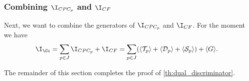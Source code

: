 \documentclass[11pt]{article}
\begin{document}
\subsubsection[Combining I(CPCp) and I(CF)]{Combining $\I_{CPC_p}$ and $\I_{CF}$}\label{sect:combin_gen}

Next, we want to combine the generators of $\I_{CPC_p}$ and $\I_{CF}$. For the moment we have
\begin{equation}\label{eqn:combinatorial_ideal_decomposition_1}
    \I_{\Cc} = \sum_{p \in J} \I_{CPC_p} + \I_{CF} = \sum_{p \in J} (\langle \mathcal{T}_p \rangle + \langle \mathcal{D}_p \rangle + \langle \mathcal{S}_p \rangle) + \langle G \rangle.
\end{equation}

The remainder of this section completes the proof of \cref{th:dual_discriminator}.
\end{document}
